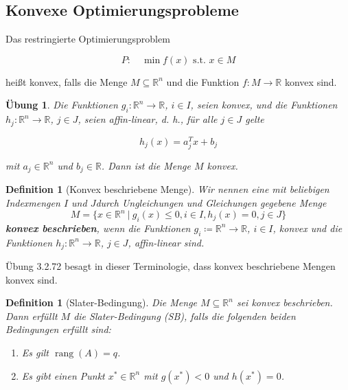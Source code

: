 \documentclass[11pt]{scrreprt}
\newcounter{thm}
\theoremstyle{thmstyle}
\numberwithin{thm}{section}
\newtheorem{definition}[thm]{Definition}
\newtheorem{uebung}[thm]{Übung}
\begin{document}
\subsection*{Konvexe Optimierungsprobleme}

Das restringierte Optimierungsproblem

$$ P: \quad  \min f (x) \text{ s.t. } x \in M $$

heißt konvex, falls die Menge $M \subseteq \mathbb{R}^n$ und die Funktion $f \colon M \rightarrow \mathbb{R}$ konvex sind.

\setcounter{thm}{71}

\begin{uebung}
	Die Funktionen $g_i \colon \mathbb{R}^n \rightarrow \mathbb{R}$, $i \in I$, seien konvex, und die Funktionen $h_j \colon \mathbb{R}^n \rightarrow \mathbb{R}$, $j \in J$, seien affin-linear, d. h., für alle $j \in J$ gelte
	
	$$ h_j (x) = a_j^T x + b_j $$
	
	mit $a_j \in \mathbb{R}^n$ und $b_j \in \mathbb{R}$. Dann ist die Menge $M$ konvex.
\end{uebung}

\begin{definition}[Konvex beschriebene Menge]
	Wir nennen eine mit beliebigen Indexmengen $I$ und $J $durch Ungleichungen und Gleichungen gegebene Menge
		$$ M = \big\{ x \in \mathbb{R}^n ~|~ g_i(x) \leq 0, i \in I, h_j(x) = 0, j \in J \big\} $$
	\textbf{konvex beschrieben}, wenn die Funktionen $g_i \coloneqq \mathbb{R}^n \rightarrow \mathbb{R}$, $i \in I$, konvex und die Funktionen $h_j \colon \mathbb{R}^n \rightarrow \mathbb{R}$, $j \in J$, affin-linear sind.
\end{definition}

Übung 3.2.72 besagt in dieser Terminologie, dass konvex beschriebene Mengen konvex sind.

\begin{definition}[Slater-Bedingung]
	Die Menge $M \subseteq \mathbb{R}^n$ sei konvex beschrieben. Dann erfüllt $M$ die Slater-Bedingung (SB), falls die folgenden beiden Bedingungen erfüllt sind:
	\begin{enumerate}[label=\alph*\upshape)]
		\item Es gilt $\operatorname{rang}(A) = q$.
		\item Es gibt einen Punkt $x^* \in \mathbb{R}^n$ mit $g(x^*) < 0$ und $h(x^*) = 0$. 
	\end{enumerate}
\end{definition}
\end{document}
